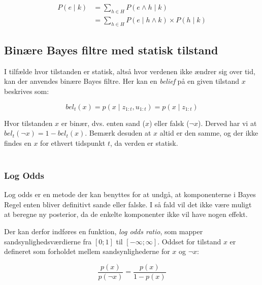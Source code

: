 \begin{equation}
\begin{split}
	P(e \mid k) &= \sum_{h \in H} P(e \wedge h \mid k) \\
	&= \sum_{h \in H}P(e \mid h \wedge k) \times P(h \mid k)
\end{split}
\end{equation}

\cite[s. 229]{ArtificialIntelligence}

\subsection{Binære Bayes filtre med statisk tilstand}\label{bayes_binaerfiltre}
I tilfælde hvor tilstanden er statisk, altså hvor verdenen ikke ændrer sig over tid, kan der anvendes binære Bayes filtre.
Her kan en \textit{belief} på en given tilstand $x$ beskrives som:

\begin{equation}
bel_t(x) = p(x \mid z_{1:t},u_{1:t}) = p(x \mid z_{1:t})
\end{equation}

Hvor tilstanden $x$ er binær, dvs. enten sand ($x$) eller falsk ($\lnot x$).
Derved har vi at $bel_t(\lnot x) = 1 - bel_t(x)$.
Bemærk desuden at $x$ altid er den samme, og der ikke findes en $x$ for ethvert tidspunkt $t$, da verden er statisk. \\ \\
\cite[s. 94]{probabilisticRobotics}

\subsubsection{Log Odds}
Log odds er en metode der kan benyttes for at undgå, at komponenterne i Bayes Regel enten bliver definitivt sande eller falske.
I så fald vil det ikke være muligt at beregne ny posterior, da de enkelte komponenter ikke vil have nogen effekt.

Der kan derfor indføres en funktion, \textit{log odds ratio}, som mapper sandsynlighedsværdierne fra $[0;1]$ til $[-\infty;\infty]$.
Oddset for tilstand $x$ er defineret som forholdet mellem sandsynlighederne for $x$ og $\lnot x$: 

\begin{equation}
\frac{p(x)}{p(\lnot x)} = \frac{p(x)}{1 - p(x)}
\end{equation} 

\cite[s. 94]{probabilisticRobotics} \\


